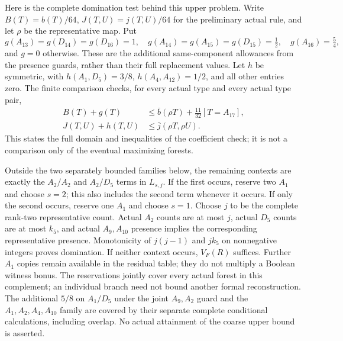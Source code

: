 Here is the complete domination test behind this upper problem. Write
$B(T)=b(T)/64$, $J(T,U)=j(T,U)/64$ for the preliminary actual rule, and
let $\rho$ be the representative map. Put
\[
 g(A_{13})=g(D_{14})=g(D_{16})=1,\quad
 g(A_{14})=g(A_{15})=g(D_{15})=\tfrac12,\quad g(A_{16})=\tfrac54,
\]
and $g=0$ otherwise. These are the additional same-component allowances
from the presence guards, rather than their full replacement values.
Let $h$ be symmetric, with $h(A_1,D_5)=3/8$,
$h(A_4,A_{12})=1/2$, and all other entries zero. The finite comparison
checks, for every actual type and every actual type pair,
\begin{align*}
 B(T)+g(T)&\le\bar b(\rho T)+\tfrac{11}{32}[T=A_{17}],\\
 J(T,U)+h(T,U)&\le\bar j(\rho T,\rho U).
\end{align*}
This states the full domain and inequalities of the coefficient check;
it is not a comparison only of the eventual maximizing forests.

Outside the two separately bounded families below, the remaining
contexts are exactly the $A_2/A_2$ and $A_2/D_5$ terms in $L_{s,j}$.
If the first occurs, reserve two $A_1$ and choose $s=2$; this also
includes the second term whenever it occurs. If only the second occurs,
reserve one $A_1$ and choose $s=1$. Choose $j$ to be the complete rank-two
representative count. Actual $A_2$ counts are at most $j$, actual $D_5$
counts are at most $k_5$, and actual $A_9,A_{10}$ presence implies the
corresponding representative presence. Monotonicity of $j(j-1)$ and
$jk_5$ on nonnegative integers proves domination. If neither context
occurs, $V_F(R)$ suffices. Further $A_1$ copies remain available in the
residual table; they do not multiply a Boolean witness bonus.
The reservations jointly cover every actual forest in this complement;
an individual branch need not bound another formal reconstruction.
The additional $5/8$ on $A_1/D_5$ under the joint $A_9,A_2$ guard and
the $A_1,A_2,A_4,A_{10}$ family are covered by their separate complete
conditional calculations, including overlap. No actual attainment of
the coarse upper bound is asserted.
